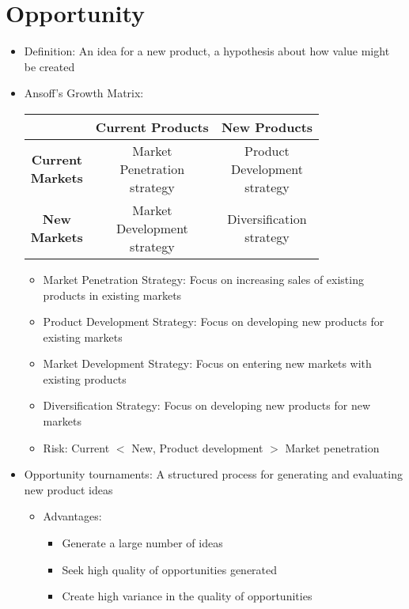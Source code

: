 \documentclass[openany,12pt,a4paper]{book}
\begin{document}
\section{Opportunity}
\begin{itemize}
    \item Definition: An idea for a new product, a hypothesis about how value might be created
    \item Ansoff's Growth Matrix:
    \begin{table}[H]
        \centering
        \begin{tabular}{c|c|c}
            \toprule
            & \textbf{Current Products} & \textbf{New Products} \\
            \midrule
            \makecell[c]{\textbf{Current}\\\textbf{Markets}} & \makecell[c]{Market\\Penetration\\strategy} & \makecell[c]{Product\\Development\\strategy} \\
            \hline
            \makecell[c]{\textbf{New}\\\textbf{Markets}} & \makecell[c]{Market\\Development\\strategy} & \makecell[c]{Diversification\\strategy} \\
            \bottomrule
        \end{tabular}
    \end{table}
    \begin{itemize}
        \item Market Penetration Strategy: Focus on increasing sales of existing products in existing markets
        \item Product Development Strategy: Focus on developing new products for existing markets
        \item Market Development Strategy: Focus on entering new markets with existing products
        \item Diversification Strategy: Focus on developing new products for new markets
        \item Risk: Current $<$ New, Product development $>$ Market penetration 
    \end{itemize}
    \item Opportunity tournaments: A structured process for generating and evaluating new product ideas
    \begin{itemize}
        \item Advantages:
        \begin{itemize}
            \item Generate a large number of ideas
            \item Seek high quality of opportunities generated
            \item Create high variance in the quality of opportunities
        \end{itemize}
    \end{itemize}
\end{itemize}
\end{document}
